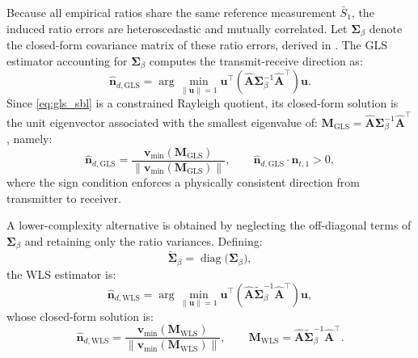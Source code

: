 \documentclass[conference]{IEEEtran}
\begin{document}
Because all empirical ratios share the same reference measurement $\bar S_{1}$, the induced ratio errors are heteroscedastic and mutually correlated. Let $\mathbf{\Sigma}_{\beta}$ denote the closed-form covariance matrix of these ratio errors, derived in \cite{acuna2025model}. The GLS estimator accounting for $\mathbf{\Sigma}_{\beta}$ computes the transmit-receive direction as:
\begin{equation}
    \hat{\mathbf{n}}_{d,\mathrm{GLS}}
    =
    \arg\min_{\|\mathbf{u}\|=1}
    \mathbf{u}^\top
    \left(\hat{\mathbf{A}}\mathbf{\Sigma}_{\beta}^{-1}\hat{\mathbf{A}}^\top\right)\mathbf{u}.
    \label{eq:gls_sbl}
\end{equation}
Since \eqref{eq:gls_sbl} is a constrained Rayleigh quotient, its closed-form solution is the unit eigenvector associated with the smallest eigenvalue of: $\mathbf{M}_{\mathrm{GLS}}=\hat{\mathbf{A}}\mathbf{\Sigma}_{\beta}^{-1}\hat{\mathbf{A}}^\top$,
namely:
\begin{equation}
    \hat{\mathbf{n}}_{d,\mathrm{GLS}}
    =
    \frac{\mathbf{v}_{\min}(\mathbf{M}_{\mathrm{GLS}})}
    {\|\mathbf{v}_{\min}(\mathbf{M}_{\mathrm{GLS}})\|},
    \qquad
    \hat{\mathbf{n}}_{d,\mathrm{GLS}}\cdot\mathbf{n}_{t,1}>0,
    \label{eq:closed_form_gls_sbl}
\end{equation}
where the sign condition enforces a physically consistent direction from transmitter to receiver.

A lower-complexity alternative is obtained by neglecting the off-diagonal terms of $\mathbf{\Sigma}_{\beta}$ and retaining only the ratio variances. Defining:
\begin{equation}
    \tilde{\mathbf{\Sigma}}_{\beta}=\operatorname{diag}\!\bigl(\mathbf{\Sigma}_{\beta}\bigr),
    \label{eq:Dbeta}
\end{equation}
the WLS estimator is:
\begin{equation}
    \hat{\mathbf{n}}_{d,\mathrm{WLS}}
    =
    \arg\min_{\|\mathbf{u}\|=1}
    \mathbf{u}^\top
    \left(\hat{\mathbf{A}}\tilde{\mathbf{\Sigma}}_{\beta}^{-1}\hat{\mathbf{A}}^\top\right)\mathbf{u},
    \label{eq:wls_sbl}
\end{equation}
whose closed-form solution is:
\begin{equation}
    \hat{\mathbf{n}}_{d,\mathrm{WLS}}
    =
    \frac{\mathbf{v}_{\min}(\mathbf{M}_{\mathrm{WLS}})}
    {\|\mathbf{v}_{\min}(\mathbf{M}_{\mathrm{WLS}})\|},
    \qquad
    \mathbf{M}_{\mathrm{WLS}}=\hat{\mathbf{A}}\tilde{\mathbf{\Sigma}}_{\beta}^{-1}\hat{\mathbf{A}}^\top.
    \label{eq:closed_form_wls_sbl}
\end{equation}
\end{document}
